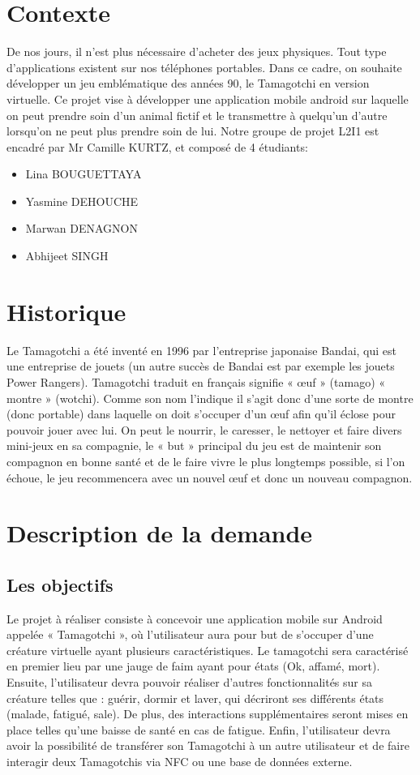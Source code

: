 \documentclass{rapportECL}
\begin{document}
\section{Contexte}
De nos jours, il n’est plus nécessaire d’acheter des jeux physiques. Tout type d’applications existent sur nos téléphones portables. Dans ce cadre, on souhaite développer un jeu emblématique des années 90, le Tamagotchi en version virtuelle. Ce projet vise à développer une application mobile android sur laquelle on peut prendre soin d’un animal fictif et le transmettre à quelqu’un d’autre lorsqu’on ne peut plus prendre soin de lui.
Notre groupe de projet L2I1 est encadré par Mr Camille KURTZ, et composé de 4 étudiants:
\begin{itemize}[label=\textbullet]
\item Lina BOUGUETTAYA


\item Yasmine DEHOUCHE


\item Marwan DENAGNON


\item Abhijeet SINGH
\end{itemize}
\section{Historique}
Le Tamagotchi a été inventé en 1996 par l’entreprise japonaise Bandai, qui est une entreprise de jouets (un autre succès de Bandai est par exemple les jouets Power Rangers). 
Tamagotchi traduit en français signifie « œuf » (tamago) « montre » (wotchi). Comme son nom l’indique il s’agit donc d’une sorte de montre (donc portable) dans laquelle on doit s’occuper d’un œuf afin qu’il éclose pour pouvoir jouer avec lui. 
On peut le nourrir, le caresser, le nettoyer et faire divers mini-jeux en sa compagnie, le « but » principal du jeu est de maintenir son compagnon en bonne santé et de le faire vivre le plus longtemps possible, si l’on échoue, le jeu recommencera avec un nouvel œuf et donc un nouveau compagnon.
\section{Description de la demande}
\subsection{Les objectifs}
Le projet à réaliser consiste à concevoir une application mobile sur Android appelée « Tamagotchi », où l’utilisateur aura pour but de s’occuper d’une créature virtuelle ayant plusieurs caractéristiques.
Le tamagotchi sera caractérisé en premier lieu par une jauge de faim ayant pour états (Ok, affamé, mort). Ensuite, l’utilisateur devra pouvoir réaliser d’autres fonctionnalités sur sa créature telles que : guérir, dormir et laver, qui décriront ses différents états (malade, fatigué, sale).
De plus, des interactions supplémentaires seront mises en place telles qu’une baisse de santé en cas de fatigue.
Enfin, l’utilisateur devra avoir la possibilité de transférer son Tamagotchi à un autre utilisateur et de faire interagir deux Tamagotchis via NFC ou une base de données externe.
\end{document}

